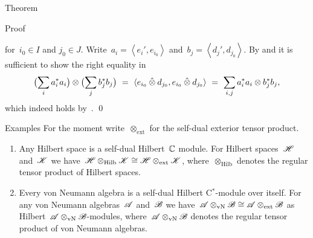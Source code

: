 \documentclass[b]{subfiles}
\begin{document}
\begin{parsec}
\begin{point}{Theorem}
\begin{point}{Proof}
\begin{point}
    for~$i_0 \in I$ and $j_0 \in J$.
Write~$a_i = \left<e_i',e_{i_0}\right>$
    and~$b_j = \left<d_j',d_{j_0}\right>$.
By  and 
it is sufficient to show the right equality in
    \begin{equation*}
        \bigl(\sum_i a_i^*a_i\bigr) \otimes \bigl(\sum_j b_j^*b_j\bigr) \ = \ 
    \langle e_{i_0}\hotimes d_{j_0}, e_{i_0}\hotimes d_{j_0}\rangle
    \ =\  \sum_{i,j} a_i^*a_i \otimes b_j^*b_j,
    \end{equation*}
    which indeed holds by~. \qed
\end{point}
\end{point}
\end{point}

\begin{point}{Examples}%
For the moment write~$\otimes_{\text{ext}}$ for the self-dual exterior
    tensor product.
\begin{enumerate}
\item
Any Hilbert space is a self-dual Hilbert~$\mathbb{C}$ module.
For Hilbert spaces~$\mathscr{H}$ and~$\mathscr{K}$
    we have~$\mathscr{H} \otimes_{\text{Hilb}} \mathscr{K}
        \cong \mathscr{H} \otimes_{\text{ext}} \mathscr{K}$,
    where~$\otimes_{\text{Hilb}}$ denotes the regular tensor product of
    Hilbert spaces.
\item
Every von Neumann algebra is a self-dual Hilbert C$^*$-module
    over itself.
For any von Neumann algebras~$\mathscr{A}$ and~$\mathscr{B}$
    we have~$\mathscr{A}\otimes_{\text{vN}} \mathscr{B}
        \cong \mathscr{A} \otimes_{\text{ext}} \mathscr{B}$
        as Hilbert~$\mathscr{A}\otimes_{\text{vN}} \mathscr{B}$-modules,
        where~$\mathscr{A}\otimes_{\text{vN}}\mathscr{B}$ denotes the regular
        tensor product of von Neumann algebras.
\end{enumerate}
\end{point}
\end{parsec}
\end{document}
